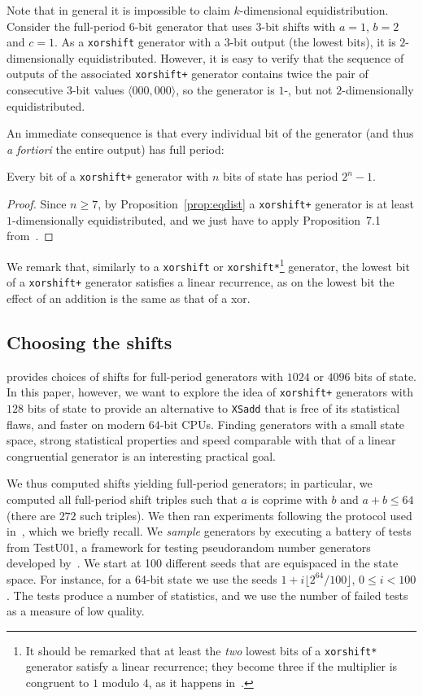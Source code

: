 \documentclass{acmsmalltr}
\newcommand{\xorshift}[1][]{\texttt{xorshift#1}\xspace}
\newcommand{\xorshifts}[1][]{\texttt{xorshift#1*}\xspace}
\newcommand{\xorshiftp}[1][]{\texttt{xorshift#1+}\xspace}
\newcommand{\xsadd}{\texttt{XSadd}\xspace}
\newcommand{\la}{\langle}
\newcommand{\ra}{\rangle}
\begin{document}
Note that in general it is impossible to claim $k$-dimensional equidistribution.
Consider the full-period $6$-bit generator that uses $3$-bit shifts with
$a=1$, $b=2$ and $c=1$. As a \xorshift
generator with a $3$-bit output (the lowest bits), it is $2$-dimensionally
equidistributed.
However, it is easy to verify that the sequence of outputs of the associated \xorshiftp generator contains twice the pair
of consecutive $3$-bit values $\la000,000\ra$, so the generator is $1$-, but not
$2$-dimensionally equidistributed.

An immediate consequence is that every individual bit of the generator 
(and thus \textit{a fortiori} the entire output) has full period:

\begin{proposition}
Every bit of a \xorshiftp generator with $n$ bits of state has period
$2^n-1$.
\end{proposition}
\begin{proof}
Since $n\geq 7$, by Proposition~\ref{prop:eqdist} a \xorshiftp generator is at
least $1$-dimensionally equidistributed, and we just have to apply
Proposition~7.1 from~\cite{VigEEMXGS}.
\end{proof}

We remark that, similarly to a \xorshift or \xorshifts\footnote{It should
be remarked that at least the \emph{two} lowest bits of a \xorshifts
generator satisfy a linear recurrence; they become three if the multiplier
is congruent to $1$ modulo $4$, as it happens in~\cite{VigEEMXGS}.}
generator, the lowest bit of a \xorshiftp generator satisfies a linear
recurrence, as on the lowest bit the effect of an addition is the same as
that of a xor.

\subsection{Choosing the shifts}
\label{sec:setup}

 provides choices of shifts for full-period
generators with $1024$ or $4096$ bits of state. In this paper, however, we want
to explore the idea of \xorshiftp generators with $128$ bits of state to provide
an alternative to \xsadd that is free of its statistical flaws, and faster on
modern $64$-bit CPUs. Finding generators with a small state space, strong
statistical properties and speed comparable with that of a linear congruential
generator is an interesting practical goal.

We thus computed shifts yielding full-period generators;
in particular, we computed all full-period shift triples such that $a$ is coprime
with $b$ and $a+b\leq 64$ (there are $272$ such triples).
We then ran experiments following the protocol used in~\cite{VigEEMXGS},
which we briefly recall. We \emph{sample} generators by executing a battery
of tests from TestU01, a framework for testing pseudorandom number
generators developed by~. We start at 100 different seeds that
are equispaced in the state space. For instance, for a 64-bit state we use the seeds $1+i\lfloor
2^{64}/100\rfloor$, $0\leq i<100$. The tests produce a number of statistics, and
we use the number of failed tests as a measure of low quality.
\end{document}
